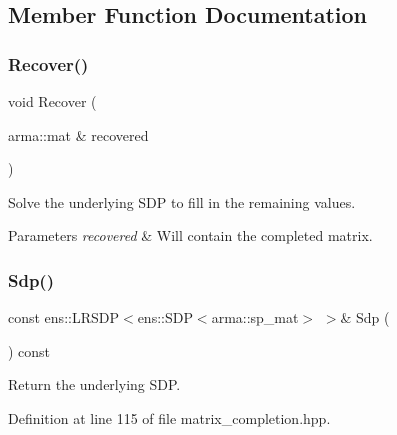\subsection{Member Function Documentation}
\mbox{\label{classmlpack_1_1matrix__completion_1_1MatrixCompletion_aa758764911348e5540da0ffd092eba75}} 
\subsubsection{Recover()}
{\footnotesize\ttfamily void Recover (\begin{DoxyParamCaption}\item[{arma\+::mat \&}]{recovered }\end{DoxyParamCaption})}



Solve the underlying S\+DP to fill in the remaining values. 


\begin{DoxyParams}{Parameters}
{\em recovered} & Will contain the completed matrix. \\
\hline
\end{DoxyParams}
\mbox{\label{classmlpack_1_1matrix__completion_1_1MatrixCompletion_ac1d73e9809358a87bd0092a77f8f00be}} 
\subsubsection{Sdp()\hspace{0.1cm}{\footnotesize\ttfamily [1/2]}}
{\footnotesize\ttfamily const ens\+::\+L\+R\+S\+DP$<$ens\+::\+S\+DP$<$arma\+::sp\+\_\+mat$>$ $>$\& Sdp (\begin{DoxyParamCaption}{ }\end{DoxyParamCaption}) const\hspace{0.3cm}{\ttfamily [inline]}}



Return the underlying S\+DP. 



Definition at line 115 of file matrix\+\_\+completion.\+hpp.

